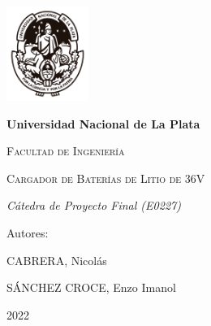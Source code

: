 \documentclass[12pt]{report}
\begin{document}
\begin{titlepage}
    \centering
    {\includegraphics[width=0.2\textwidth]{images/unlp-escudo.png}\par}
    \vspace{1cm}
    {\bfseries\LARGE Universidad Nacional de La Plata \par}
    \vspace{1cm}
    {\scshape\LARGE Facultad de Ingenier\'ia \par}
    \vspace{3cm}
    {\scshape\Huge Cargador de Bater\'ias de Litio de 36V \par}
    \vspace{3cm}
    {\itshape\Large C\'atedra de Proyecto Final (E0227) \par}
    \vfill
    {\Large Autores: \par}
    {\Large CABRERA, Nicol\'as \par}
    {\Large S\'ANCHEZ CROCE, Enzo Imanol \par}
    \vfill
    {\Large 2022 \par}
\end{titlepage}
\thispagestyle{empty}
\newpage


\tableofcontents
\newpage


\printbibliography
\end{document}
